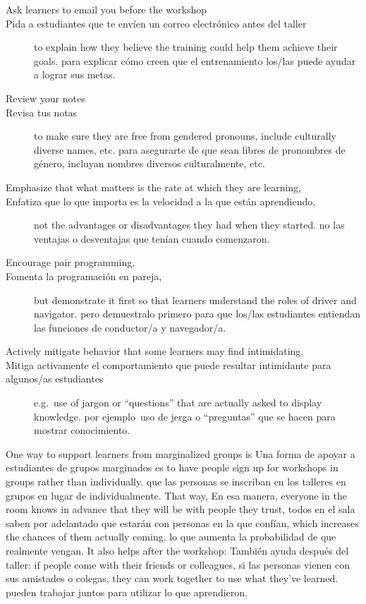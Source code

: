 \begin{description}

\item[Ask learners to email you before the workshop]
\item[Pida a estudiantes que te envíen un correo electrónico antes del taller]
  to explain how they believe the training could help them achieve their goals.
  para explicar cómo creen que el entrenamiento los/las puede ayudar a lograr sus metas.

\item[Review your notes]
\item[Revisa tus notas]
  to make sure they are free from gendered pronouns, include culturally diverse names, etc.
  para asegurarte de que sean libres de pronombres de género, incluyan nombres diversos culturalmente, etc.

\item[Emphasize that what matters is the rate at which they are learning,]
\item[Enfatiza que lo que importa es la velocidad a la que están aprendiendo,]
  not the advantages or disadvantages they had when they started.
  no las ventajas o desventajas que tenían cuando comenzaron.

\item[Encourage pair programming,]
\item[Fomenta la programación en pareja,]
  but demonstrate it first so that learners understand the roles of driver and navigator.
  pero demuestralo primero para que los/las estudiantes entiendan las funciones de conductor/a y navegador/a.

\item[Actively mitigate behavior that some learners may find intimidating,]
\item[Mitiga activamente el comportamiento que puede resultar intimidante para algunos/as estudiantes]
  e.g.\ use of jargon or ``questions'' that are actually asked to display knowledge.
  por ejemplo\ uso de jerga o ``preguntas'' que se hacen para mostrar conocimiento.

\end{description}

One way to support learners from marginalized groups is
Una forma de apoyar a estudiantes de grupos marginados es
to have people sign up for workshops in groups rather than individually.
que las personas se inscriban en los talleres en grupos en lugar de individualmente.
That way,
En esa manera,
everyone in the room knows in advance that they will be with people they trust,
todos en el sala saben por adelantado que estarán con personas en la que confían,
which increases the chances of them actually coming.
lo que aumenta la probabilidad de que realmente vengan.
It also helps after the workshop:
También ayuda después del taller:
if people come with their friends or colleagues,
si las personas vienen con sus amistades o colegas,
they can work together to use what they've learned.
pueden trabajar juntos para utilizar lo que aprendieron.

